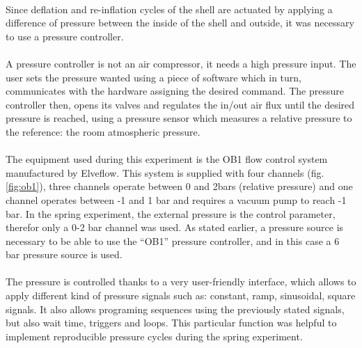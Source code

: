 \paragraph{}
Since deflation and re-inflation cycles of the shell are actuated by applying a difference of pressure between the inside of the shell and outside, it was necessary to use a pressure controller.
\paragraph{}
A pressure controller is not an air compressor, it needs a high pressure input. The user sets the pressure wanted using a piece of software which in turn, communicates with the hardware assigning the desired command. The pressure controller then, opens its valves and regulates the in/out air flux until the desired pressure is reached, using a pressure sensor which measures a relative pressure to the reference: the room atmospheric pressure.
\paragraph{}
The equipment used during this experiment is the OB1 flow control system manufactured by Elveflow\textcopyright. This system is supplied with four channels (fig.\ref{fig:ob1}), three channels operate between 0 and 2bars (relative pressure) and one channel operates between -1 and 1 bar and requires a vacuum pump to reach -1 bar.
In the spring experiment, the external pressure is the control parameter, therefor only a 0-2 bar channel was used.
As stated earlier, a pressure source is necessary to be able to use the "`OB1"' pressure controller, and in this case a 6 bar pressure source is used.
\paragraph{}
The pressure is controlled thanks to a very user-friendly interface, which allows to apply different kind of pressure signals such as: constant, ramp, sinusoidal, square signals. It also allows programing sequences using the previously stated signals, but also wait time, triggers and loops. This particular function was helpful to implement reproducible pressure cycles during the spring experiment.
